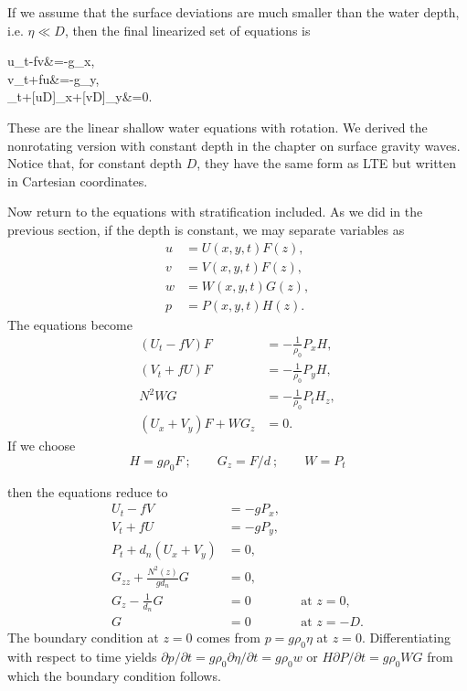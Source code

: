 \sourcepagebreak

If we assume that the surface deviations are much smaller than the water depth, i.e.
$\eta\ll D$, then the final linearized set of equations is
\begin{wavealign}
	u_t-fv&=-g\eta_x,\\
	v_t+fu&=-g\eta_y,\\
	\eta_t+[uD]_x+[vD]_y&=0.
\end{wavealign}
These are the linear shallow water equations with rotation. We derived the
nonrotating version with constant depth in the chapter on surface gravity waves.
Notice that, for constant depth $D$, they have the same form as LTE but written in
Cartesian coordinates.

Now return to the equations with stratification included. As we did in the
previous section, if the depth is constant, we may separate variables as
\begin{align*}
	u & =U(x,y,t)F(z), \\
	v & =V(x,y,t)F(z), \\
	w & =W(x,y,t)G(z), \\
	p & =P(x,y,t)H(z).
\end{align*}
The equations become
\begin{align*}
	(U_t-fV)F       & =-\frac{1}{\rho_0}P_xH,   \\
	(V_t+fU)F       & =-\frac{1}{\rho_0}P_yH,   \\
	N^2WG           & =-\frac{1}{\rho_0}P_tH_z, \\
	(U_x+V_y)F+WG_z & =0.
\end{align*}
If we choose
\[
	H=g\rho_0F\ ;\qquad G_z=F/d\ ;\qquad W=P_t
\]

\sourcepagebreak

then the equations reduce to
\begin{align*}
	U_t-fV                       & =-gP_x,                      \\
	V_t+fU                       & =-gP_y,                      \\
	P_t+d_n(U_x+V_y)             & =0,                          \\
	G_{zz}+\frac{N^2(z)}{g d_n}G & =0,                          \\
	G_z-\frac{1}{d_n}G           & =0      &  & \text{at }z=0,  \\
	G                            & =0      &  & \text{at }z=-D.
\end{align*}
The boundary condition at $z=0$ comes from $p=g\rho_0\eta$ at $z=0$. Differentiating with
respect to time yields $\partial p/\partial t=g\rho_0\partial\eta/\partial t=g\rho_0w$ or
$H\partial P/\partial t=g\rho_0WG$ from which the
boundary condition follows.

